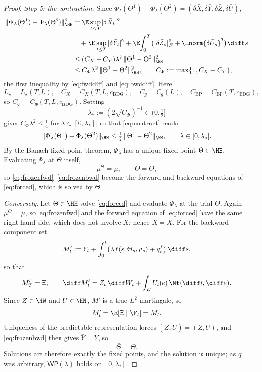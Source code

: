 \begin{proof}
\emph{Step 5: the contraction.} Since
$\Phi_\lambda(\Theta^1)-\Phi_\lambda(\Theta^2)
=(\delta\bar X,\delta\bar Y,\delta\bar Z,\delta\bar U)$,
\begin{equation}\label{eq:contract}
\begin{aligned}
\|\Phi_\lambda(\Theta^1)-\Phi_\lambda(\Theta^2)\|_{\HH}^2
&=\E\sup_{t\le T}|\delta\bar X_t|^2\\
&\quad+\E\sup_{t\le T}|\delta\bar Y_t|^2
+\E\!\int_0^T\!\big(|\delta\bar Z_s|_F^2+\Lnorm{\delta\bar U_s}^2\big)\diff s\\
&\le(C_X+C_Y)\lambda^2\,\|\Theta^1-\Theta^2\|_{\HH}^2\\
&\le C_\Phi\lambda^2\,\|\Theta^1-\Theta^2\|_{\HH}^2 ,
\qquad C_\Phi:=\max\{1,C_X+C_Y\} ,
\end{aligned}
\end{equation}
the first inequality by \eqref{eq:fwddiff} and \eqref{eq:bwddiff}. Here
\[
L_\star=L_\star(T,L),\quad C_X=C_X(T,L,c_{\mathrm{BDG}}),\quad
C_g=C_g(L),\quad C_{\mathrm{BP}}=C_{\mathrm{BP}}(T,c_{\mathrm{BDG}}),
\]
so $C_\Phi=C_\Phi(T,L,c_{\mathrm{BDG}})$. Setting
\[
\lambda_*:=(2\sqrt{C_\Phi})^{-1}\in(0,\tfrac12]
\]
gives $C_\Phi\lambda^2\le\tfrac14$ for $\lambda\in[0,\lambda_*]$, so that \eqref{eq:contract}
reads
\[
\|\Phi_\lambda(\Theta^1)-\Phi_\lambda(\Theta^2)\|_{\HH}
\le\tfrac12\,\|\Theta^1-\Theta^2\|_{\HH},\qquad\lambda\in[0,\lambda_*] .
\]
By the Banach fixed-point theorem, $\Phi_\lambda$ has a unique fixed point $\Theta\in\HH$.
Evaluating $\Phi_\lambda$ at $\Theta$ itself,
\[
\mu^\Theta=\mu,\qquad\bar\Theta=\Theta ,
\]
so \eqref{eq:frozenfwd}--\eqref{eq:frozenbwd} become the forward and backward equations of
\eqref{eq:forced}, which is solved by $\Theta$.

\emph{Conversely.} Let $\Theta\in\HH$ solve \eqref{eq:forced} and evaluate $\Phi_\lambda$
at the trial $\Theta$. Again $\mu^\Theta=\mu$, so \eqref{eq:frozenfwd} and the forward
equation of \eqref{eq:forced} have the same right-hand side, which does not involve
$\bar X$; hence $\bar X=X$. For the backward component set
\[
M'_t:=Y_t+\int_0^t\!\big(\lambda f(s,\Theta_s,\mu_s)+q^f_s\big)\,\diff s ,
\]
so that
\[
M'_T=\Xi,\qquad
\diff M'_t=Z_t\,\diff W_t+\int_E U_t(e)\,\Nt(\diff t,\diff e) .
\]
Since $Z\in\HW$ and $U\in\HN$, $M'$ is a true $L^2$-martingale, so
\[
M'_t=\E[\Xi\mid\F_t]=M_t .
\]
Uniqueness of the predictable representation forces $(\bar Z,\bar U)=(Z,U)$, and
\eqref{eq:frozenbwd} then gives $\bar Y=Y$, so
\[
\bar\Theta=\Theta .
\]
Solutions are therefore exactly the fixed points, and the solution is unique; as $q$ was
arbitrary, $\mathsf{WP}(\lambda)$ holds on $[0,\lambda_*]$.
\end{proof}

